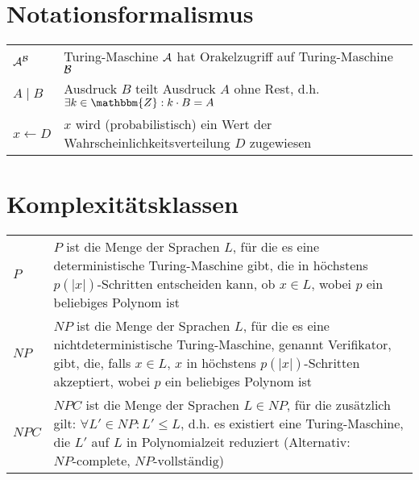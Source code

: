 \section{Notationsformalismus}
\begin{tabularx}{\textwidth}{ p{} | X }
	$\mathcal{A}^{\mathcal{B}}$ & Turing-Maschine $\mathcal{A}$ hat Orakelzugriff auf Turing-Maschine $\mathcal{B}$\\
	$A \mid B$ & Ausdruck $B$ teilt Ausdruck $A$ ohne Rest, d.h. $\exists k \in \mathbbm{Z} : k \cdot B = A$\\
	$x \leftarrow D$ & $x$ wird (probabilistisch) ein Wert der Wahrscheinlichkeitsverteilung $D$ zugewiesen
\end{tabularx}

\section{Komplexitätsklassen}
\begin{tabularx}{\textwidth}{ p{} | X }
	$P$ & $P$ ist die Menge der Sprachen $L$, für die es eine deterministische Turing-Maschine gibt, die in höchstens $p(\vert x \vert)$-Schritten entscheiden kann,
	ob ${x \in L}$, wobei $p$ ein beliebiges Polynom ist\\
	$NP$ & $NP$ ist die Menge der Sprachen $L$, für die es eine nichtdeterministische Turing-Maschine, genannt Verifikator, gibt, die, falls ${x \in L}$, $x$ in höchstens
	$p(\vert x \vert)$-Schritten akzeptiert, wobei $p$ ein beliebiges Polynom ist\\
	$NPC$ & $NPC$ ist die Menge der Sprachen $L \in NP$, für die zusätzlich gilt: ${\forall L' \in NP : L' \leq L}$, d.h. es existiert eine Turing-Maschine,
	die $L'$ auf $L$ in Polynomialzeit reduziert (Alternativ: $NP\text{-complete}$, $NP\text{-vollständig}$)\\
\end{tabularx}

